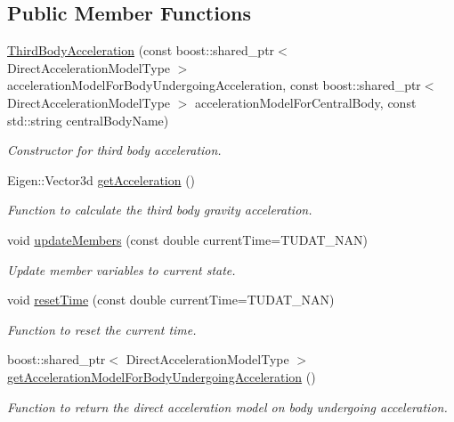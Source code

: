 \subsection*{Public Member Functions}
\begin{DoxyCompactItemize}
\item 
\hyperlink{classtudat_1_1gravitation_1_1ThirdBodyAcceleration_a98fd388ce742522941d7d0dd6313a001}{Third\+Body\+Acceleration} (const boost\+::shared\+\_\+ptr$<$ Direct\+Acceleration\+Model\+Type $>$ acceleration\+Model\+For\+Body\+Undergoing\+Acceleration, const boost\+::shared\+\_\+ptr$<$ Direct\+Acceleration\+Model\+Type $>$ acceleration\+Model\+For\+Central\+Body, const std\+::string central\+Body\+Name)
\begin{DoxyCompactList}\small\item\em Constructor for third body acceleration. \end{DoxyCompactList}\item 
Eigen\+::\+Vector3d \hyperlink{classtudat_1_1gravitation_1_1ThirdBodyAcceleration_a595cb6cbc9e5d930be8394ec8b157dbb}{get\+Acceleration} ()
\begin{DoxyCompactList}\small\item\em Function to calculate the third body gravity acceleration. \end{DoxyCompactList}\item 
void \hyperlink{classtudat_1_1gravitation_1_1ThirdBodyAcceleration_afdb74715179d8da928b1d3616976f795}{update\+Members} (const double current\+Time=T\+U\+D\+A\+T\+\_\+\+N\+AN)
\begin{DoxyCompactList}\small\item\em Update member variables to current state. \end{DoxyCompactList}\item 
void \hyperlink{classtudat_1_1gravitation_1_1ThirdBodyAcceleration_af94e6418c15acf6793f9bf7cd4924746}{reset\+Time} (const double current\+Time=T\+U\+D\+A\+T\+\_\+\+N\+AN)
\begin{DoxyCompactList}\small\item\em Function to reset the current time. \end{DoxyCompactList}\item 
boost\+::shared\+\_\+ptr$<$ Direct\+Acceleration\+Model\+Type $>$ \hyperlink{classtudat_1_1gravitation_1_1ThirdBodyAcceleration_ae77b0c054f2c8a31825e1d0d8e1004eb}{get\+Acceleration\+Model\+For\+Body\+Undergoing\+Acceleration} ()
\begin{DoxyCompactList}\small\item\em Function to return the direct acceleration model on body undergoing acceleration. \end{DoxyCompactList}\item 

\end{DoxyCompactItemize}

